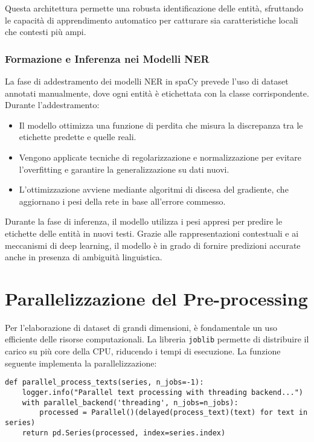 Questa architettura permette una robusta identificazione delle entità, sfruttando le capacità di apprendimento automatico per catturare sia caratteristiche locali che contesti più ampi.

\subsubsection{Formazione e Inferenza nei Modelli NER}
La fase di addestramento dei modelli NER in spaCy prevede l'uso di dataset annotati manualmente, dove ogni entità è etichettata con la classe corrispondente. Durante l'addestramento:
\begin{itemize}
    \item Il modello ottimizza una funzione di perdita che misura la discrepanza tra le etichette predette e quelle reali.
    \item Vengono applicate tecniche di regolarizzazione e normalizzazione per evitare l'overfitting e garantire la generalizzazione su dati nuovi.
    \item L'ottimizzazione avviene mediante algoritmi di discesa del gradiente, che aggiornano i pesi della rete in base all'errore commesso.
\end{itemize}

Durante la fase di inferenza, il modello utilizza i pesi appresi per predire le etichette delle entità in nuovi testi. Grazie alle rappresentazioni contestuali e ai meccanismi di deep learning, il modello è in grado di fornire predizioni accurate anche in presenza di ambiguità linguistica.



\section{Parallelizzazione del Pre-processing}
Per l'elaborazione di dataset di grandi dimensioni, è fondamentale un uso efficiente delle risorse computazionali. La libreria \texttt{joblib} permette di distribuire il carico su più core della CPU, riducendo i tempi di esecuzione. La funzione seguente implementa la parallelizzazione:

\begin{lstlisting}[caption={Funzione parallel\_process\_texts}]
def parallel_process_texts(series, n_jobs=-1):
    logger.info("Parallel text processing with threading backend...")
    with parallel_backend('threading', n_jobs=n_jobs):
        processed = Parallel()(delayed(process_text)(text) for text in series)
    return pd.Series(processed, index=series.index)
\end{lstlisting}

